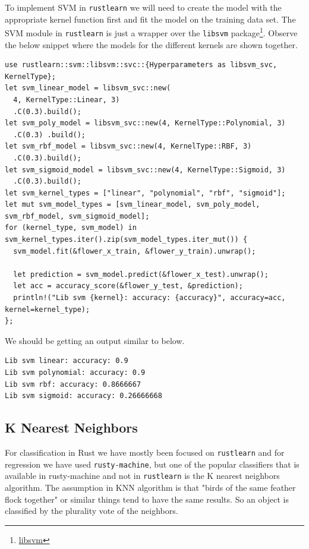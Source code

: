 \documentclass{book}
\begin{document}
To implement SVM in \lstinline{rustlearn} we will need to create the model with the appropriate kernel function first and fit the model on the training data set. The SVM module in \lstinline{rustlearn} is just a wrapper over the \lstinline{libsvm} package\footnote{\href{https://www.csie.ntu.edu.tw/~cjlin/libsvm/}{libsvm}}. Observe the below snippet where the models for the different kernels are shown together.

\begin{lstlisting}[caption={chapter3\\/rustlearn\_classification\_tasks\\/src\\/trees\\.rs}]
use rustlearn::svm::libsvm::svc::{Hyperparameters as libsvm_svc, KernelType};
let svm_linear_model = libsvm_svc::new(
  4, KernelType::Linear, 3)
  .C(0.3).build();
let svm_poly_model = libsvm_svc::new(4, KernelType::Polynomial, 3)
  .C(0.3) .build();
let svm_rbf_model = libsvm_svc::new(4, KernelType::RBF, 3)
  .C(0.3).build();
let svm_sigmoid_model = libsvm_svc::new(4, KernelType::Sigmoid, 3)
  .C(0.3).build();
let svm_kernel_types = ["linear", "polynomial", "rbf", "sigmoid"];
let mut svm_model_types = [svm_linear_model, svm_poly_model, svm_rbf_model, svm_sigmoid_model];
for (kernel_type, svm_model) in svm_kernel_types.iter().zip(svm_model_types.iter_mut()) {
  svm_model.fit(&flower_x_train, &flower_y_train).unwrap();

  let prediction = svm_model.predict(&flower_x_test).unwrap();
  let acc = accuracy_score(&flower_y_test, &prediction);
  println!("Lib svm {kernel}: accuracy: {accuracy}", accuracy=acc, kernel=kernel_type);
};
\end{lstlisting}

We should be getting an output similar to below.

\begin{lstlisting}[caption={output}]
Lib svm linear: accuracy: 0.9
Lib svm polynomial: accuracy: 0.9
Lib svm rbf: accuracy: 0.8666667
Lib svm sigmoid: accuracy: 0.26666668
\end{lstlisting}


\label{sub:support_vector_machines}

\subsection{K Nearest Neighbors}%
For classification in Rust we have mostly been focused on \lstinline{rustlearn} and for regression we have used \lstinline{rusty-machine}, but one of the popular classifiers that is available in rusty-machine and not in \lstinline{rustlearn} is the K nearest neighbors algorithm. The assumption in KNN algorithm is that "birds of the same feather flock together" or similar things tend to have the same results. So an object is classified by the plurality vote of the neighbors.
\end{document}
